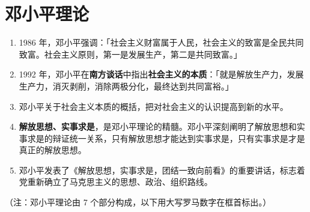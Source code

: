 \documentclass[UTF8]{ctexart}
\newcommand\Emph[2]{\colorbox{c#1-light}{\textcolor{c#1-emph}{\textbf{#2}}}}
\begin{document}
\newpage
{}
\BgThispage
\pagecolor{c6-med}
\section{邓小平理论}\label{sec:6}
\begin{enumerate}[start=1]
  \item 1986 年，邓小平强调：「社会主义财富属于人民，社会主义的致富是全民共同致富。社会主义原则，第一是发展生产，第二是共同致富。」
  \item 1992 年，邓小平在\Emph{6}{南方谈话}中指出\Emph{6}{社会主义的本质}：「就是解放生产力，发展生产力，消灭剥削，消除两极分化，最终达到共同富裕。」
  \item 邓小平关于社会主义本质的概括，把对社会主义的认识提高到新的水平。
  \item \Emph{6}{解放思想、实事求是}，是邓小平理论的精髓。邓小平深刻阐明了解放思想和实事求是的辩证统一关系，只有解放思想才能达到实事求是，只有实事求是才是真正的解放思想。
  \item 邓小平发表了《解放思想，实事求是，团结一致向前看》的重要讲话，标志着党重新确立了马克思主义的思想、政治、组织路线。
\end{enumerate}

\textcolor{c6-emph}{（注：邓小平理论由 7 个部分构成，以下用大写罗马数字在框首标出。）}
\end{document}
